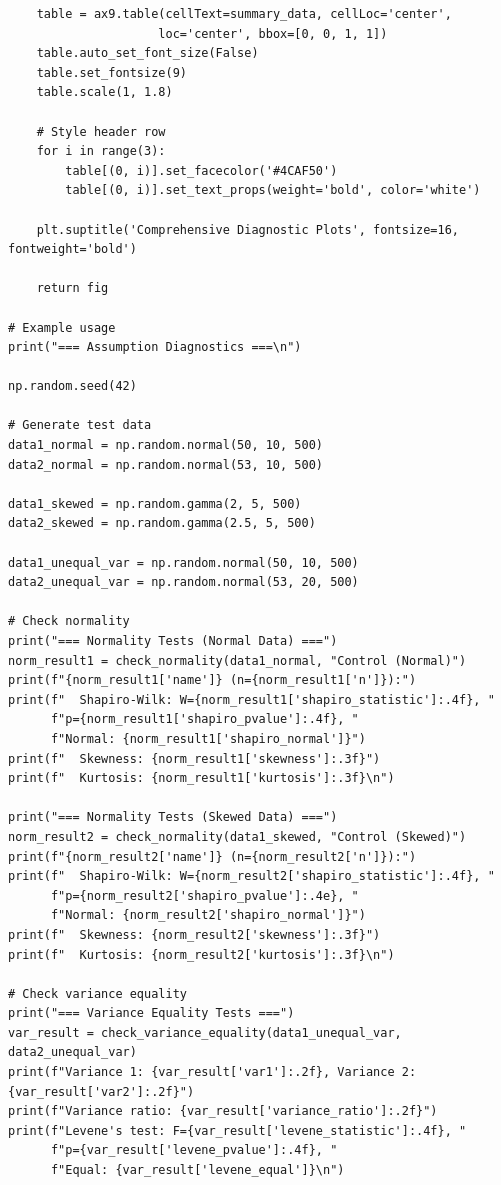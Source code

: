 \begin{lstlisting}
    table = ax9.table(cellText=summary_data, cellLoc='center',
                     loc='center', bbox=[0, 0, 1, 1])
    table.auto_set_font_size(False)
    table.set_fontsize(9)
    table.scale(1, 1.8)

    # Style header row
    for i in range(3):
        table[(0, i)].set_facecolor('#4CAF50')
        table[(0, i)].set_text_props(weight='bold', color='white')

    plt.suptitle('Comprehensive Diagnostic Plots', fontsize=16, fontweight='bold')

    return fig

# Example usage
print("=== Assumption Diagnostics ===\n")

np.random.seed(42)

# Generate test data
data1_normal = np.random.normal(50, 10, 500)
data2_normal = np.random.normal(53, 10, 500)

data1_skewed = np.random.gamma(2, 5, 500)
data2_skewed = np.random.gamma(2.5, 5, 500)

data1_unequal_var = np.random.normal(50, 10, 500)
data2_unequal_var = np.random.normal(53, 20, 500)

# Check normality
print("=== Normality Tests (Normal Data) ===")
norm_result1 = check_normality(data1_normal, "Control (Normal)")
print(f"{norm_result1['name']} (n={norm_result1['n']}):")
print(f"  Shapiro-Wilk: W={norm_result1['shapiro_statistic']:.4f}, "
      f"p={norm_result1['shapiro_pvalue']:.4f}, "
      f"Normal: {norm_result1['shapiro_normal']}")
print(f"  Skewness: {norm_result1['skewness']:.3f}")
print(f"  Kurtosis: {norm_result1['kurtosis']:.3f}\n")

print("=== Normality Tests (Skewed Data) ===")
norm_result2 = check_normality(data1_skewed, "Control (Skewed)")
print(f"{norm_result2['name']} (n={norm_result2['n']}):")
print(f"  Shapiro-Wilk: W={norm_result2['shapiro_statistic']:.4f}, "
      f"p={norm_result2['shapiro_pvalue']:.4e}, "
      f"Normal: {norm_result2['shapiro_normal']}")
print(f"  Skewness: {norm_result2['skewness']:.3f}")
print(f"  Kurtosis: {norm_result2['kurtosis']:.3f}\n")

# Check variance equality
print("=== Variance Equality Tests ===")
var_result = check_variance_equality(data1_unequal_var, data2_unequal_var)
print(f"Variance 1: {var_result['var1']:.2f}, Variance 2: {var_result['var2']:.2f}")
print(f"Variance ratio: {var_result['variance_ratio']:.2f}")
print(f"Levene's test: F={var_result['levene_statistic']:.4f}, "
      f"p={var_result['levene_pvalue']:.4f}, "
      f"Equal: {var_result['levene_equal']}\n")


\end{lstlisting}
